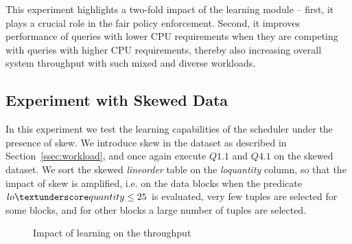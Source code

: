 This experiment highlights a two-fold impact of the learning module -- first, it plays a crucial role in the fair policy enforcement. 
Second, it improves performance of queries with lower CPU requirements when they are competing with queries with higher CPU requirements, thereby also increasing overall system throughput with such mixed and diverse workloads. 

\subsection{Experiment with Skewed Data}
In this experiment we test the learning capabilities of the \sys{} scheduler under the presence of skew. 
We introduce skew in the dataset as described in Section~\ref{ssec:workload}, and once again execute $Q1.1$ and $Q4.1$ on the skewed dataset.
We sort the skewed \textit{lineorder} table on the \textit{lo\textunderscore quantity} column, so that the impact of skew is amplified, i.e. on the data blocks when the predicate $lo\textunderscore quantity \leq 25$ is evaluated, very few tuples are selected for some blocks, and for other blocks a large number of tuples are selected.

\begin{figure}[t]
	\centering
	\vspace{-0.6em}
	\caption{Impact of learning on the throughput}
	\label{fig:q11-q41-throughput}
	\vspace{-1em}
\end{figure}
	
